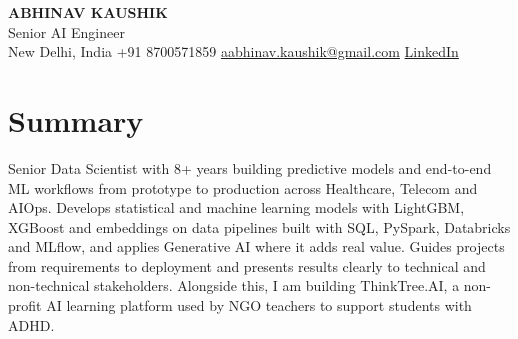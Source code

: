 \documentclass[10pt,a4paper]{article}
\begin{document}
\begin{center}
  {\LARGE\bfseries ABHINAV KAUSHIK}\\[2pt]
  {\large Senior AI Engineer}\\[2pt]
  New Delhi, India \textbar{} +91 8700571859 \textbar{} \href{mailto:aabhinav.kaushik@gmail.com}{aabhinav.kaushik@gmail.com} \textbar{} \href{https://www.linkedin.com/in/abhinav-kaushik10/}{LinkedIn}  
\end{center}

\section{Summary}
Senior Data Scientist with 8+ years building predictive models and end-to-end ML workflows from prototype to production across Healthcare, Telecom and AIOps. Develops statistical and machine learning models with LightGBM, XGBoost and embeddings on data pipelines built with SQL, PySpark, Databricks and MLflow, and applies Generative AI where it adds real value. Guides projects from requirements to deployment and presents results clearly to technical and non-technical stakeholders. Alongside this, I am building ThinkTree.AI, a non-profit AI learning platform used by NGO teachers to support students with ADHD.
\end{document}
